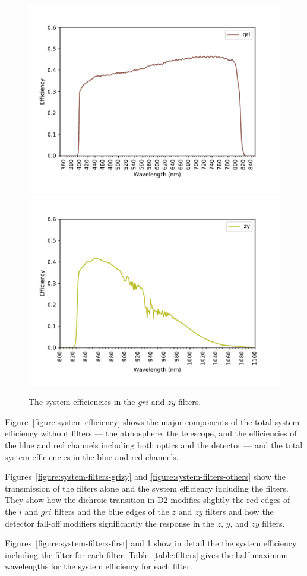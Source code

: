 \begin{figure}
\centering
\includegraphics[width=0.80\linewidth]{figure/system-gri.pdf}
\includegraphics[width=0.80\linewidth]{figure/system-zy.pdf}
\caption{The system efficiencies in the $gri$ and $zy$ filters.}
\label{figure:system-filters-last}
\end{figure}

Figure~\ref{figure:system-efficiency} shows the major components of the total system efficiency without filters --- the atmosphere, the telescope, and the efficiencies of the blue and red channels including both optics and the detector --- and the total system efficiencies in the blue and red channels.

Figures~\ref{figure:system-filters-grizy} and \ref{figure:system-filters-others} show the transmission of the filters alone and the system efficiency including the filters. They show how the dichroic transition in D2 modifies slightly the red edges of the $i$ and $gri$ filters and the blue edges of the $z$ and $zy$ filters and how the detector fall-off modifiers significantly the response in the $z$, $y$, and $zy$ filters.

Figures~\ref{figure:system-filters-first} and \ref{figure:system-filters-last} show in detail the the system efficiency including the filter for each filter. Table~\ref{table:filters} gives the half-maximum wavelengths for the system efficiency for each filter.

